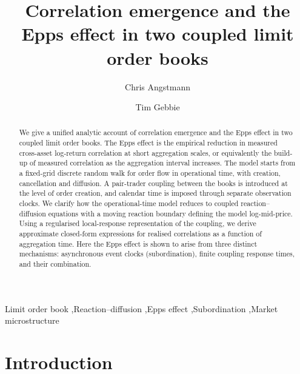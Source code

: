 \documentclass[5p,final]{elsarticle}
\begin{document}
\title{Correlation emergence and the Epps effect in two coupled limit order books}

\author[unsw-mathstats]{Chris Angstmann}
\address[unsw-mathstats]{School of Mathematics and Statistics, University of New South Wales, Sydney, NSW 2052, Australia}
\author[uct-sta]{Tim Gebbie} 
\address[uct-sta]{Department of Statistical Sciences, University of Cape Town, Rondebosch 7701, Western Cape, South Africa}

\begin{abstract}
We give a unified analytic account of correlation emergence and the Epps effect in two coupled limit order books. The Epps effect is the empirical reduction in measured cross-asset log-return correlation at short aggregation scales, or equivalently the build-up of measured correlation as the aggregation interval increases. The model starts from a fixed-grid discrete random walk for order flow in operational time, with creation, cancellation and diffusion. A pair-trader coupling between the books is introduced at the level of order creation, and calendar time is imposed through separate observation clocks. We clarify how the operational-time model reduces to coupled reaction--diffusion equations with a moving reaction boundary defining the model log-mid-price. Using a regularised local-response representation of the coupling, we derive approximate closed-form expressions for realised correlations as a function of aggregation time. Here the Epps effect is shown to arise from three distinct mechanisms: asynchronous event clocks (subordination), finite coupling response times, and their combination.
\end{abstract}

\begin{keyword}
Limit order book \sep Reaction--diffusion \sep Epps effect \sep Subordination \sep Market microstructure
\end{keyword}



\maketitle

\section{Introduction} \label{sec:introduction}
\end{document}
